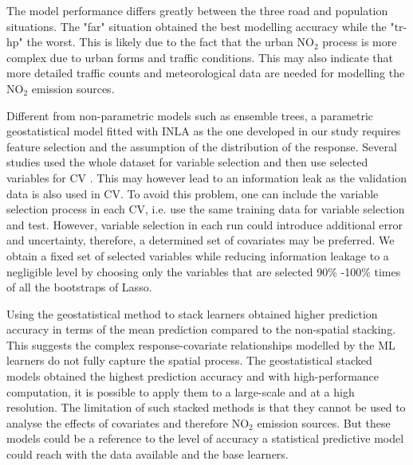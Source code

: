 \documentclass{article}
\begin{document}
The model performance differs greatly between the three road and population situations. The "far" situation obtained the best modelling accuracy while the "tr-hp" the worst. This is likely due to the fact that the urban NO$_2$ process is more complex due to urban forms and traffic conditions. This may also indicate that more detailed traffic counts and meteorological data are needed for modelling the NO$_2$ emission sources.  

Different from non-parametric models such as ensemble trees, a parametric geostatistical model fitted with INLA as the one developed in our study requires feature selection and the assumption of the distribution of the response. Several studies used the whole dataset for variable selection and then use selected variables for CV \citep{lu2020land,larkin2017global}. This may however lead to an information leak as the validation data is also used in CV. To avoid this problem, one can include the variable selection process in each CV, i.e. use the same training data for variable selection and test. However, variable selection in each run could introduce additional error and uncertainty, therefore, a determined set of covariates may be preferred. We obtain a fixed set of selected variables while reducing information leakage to a negligible level by choosing only the variables that are selected 90\% -100\% times of all the bootstraps of Lasso.

Using the geostatistical method to stack learners obtained higher prediction accuracy in terms of the mean prediction compared to the non-spatial stacking. This suggests the complex response-covariate relationships modelled by the ML learners do not fully capture the spatial process. The geostatistical stacked models obtained the highest prediction accuracy and with high-performance computation, it is possible to apply them to a large-scale and at a high resolution. The limitation of such stacked methods is that they cannot be used to analyse the effects of covariates and therefore NO$_2$ emission sources. But these models could be a reference to the level of accuracy a statistical predictive model could reach with the data available and the base learners.%
\end{document}

